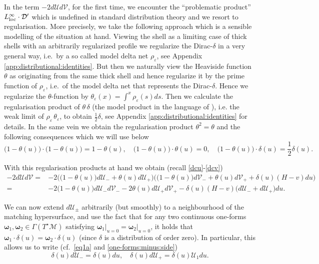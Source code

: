 \documentclass[11pt]{article}
\numberwithin{equation}{section}
\newcommand{\nn}{\nonumber}
\newcommand\M{\mathcal M}
\newcommand{\eps}{\varepsilon}
\newcommand{\bs}{\boldsymbol}
\newcommand{\cu}{\mathcal{U}}
\newcommand{\cv}{\mathcal{V}}
\begin{document}
In the term $-2d\cu d\cv$, for the first time, we encounter the ``problematic product'' $L^{\infty}_{\textup{loc}}\cdot \mathcal{D}'$ which is undefined in standard distribution theory and we resort to regularisation. More precisely, we take the following approach which is a sensible modelling of the situation at hand. Viewing the shell as a limiting case of thick shells with an arbitrarily regularized profile we regularize the Dirac-$\delta$ in a very general way, i.e.\ by a so called model delta net $\rho_\eps$, see Appendix \ref{app:distributional:identities}. But then we naturally view the Heaviside function $\theta$ as originating from the same thick shell and hence regularize it by the prime function of $\rho_\eps$, i.e.\ of the model delta net that represents the Dirac-$\delta$. Hence we regularize the $\theta$-function by $\theta_\eps(x)=\int^x\rho_\eps(s)ds$. Then we calculate the regularisation product of $\theta\,\delta$ (the model product in the language of  \cite[Ch.\ II § 7]{Obe:92}), i.e. the weak limit of $\rho_\eps\,\theta_\eps$, to obtain $\frac{1}{2}\delta$, see Appendix \ref{app:distributional:identities} for details. In the same vein we obtain the regularisation product $\theta^2=\theta$ and the following consequences which we will use below
\begin{equation}
\label{products:2}\big(1-\theta(u)\big)\cdot \big(1-\theta(u)\big)=1-\theta(u),\quad\big(1-\theta(u)\big)\cdot\theta(u)=0,\quad\big(1-\theta(u)\big)\cdot\delta(u)=\frac{1}{2}\delta(u).
\end{equation}

With this regularisation products at hand we obtain (recall \eqref{dcu}-\eqref{dcv})
\begin{align}
\nn -2d\cu d\cv=&-2 \Big(\big(1-\theta(u)\big)d\cu_-+\theta(u)d\cu_+\Big)  \Big(\big(1-\theta(u)\big) d\cv_-+\theta(u)d\cv_++\delta(u)(H-v)du\Big)\\
\label{mid:eq:1}=&-2\big(1-\theta(u)\big)d \cu_- d\cv_- -2\theta(u)d\cu_+ d\cv_+ -\delta(u) (H-v)\big(d\cu_-+d\cu_+\big) du.
\end{align}

We can now extend $d\cu_{\pm}$ arbitrarily (but smoothly) to a neighbourhood of the matching hypersurface, and use the fact that for any two continuous one-forms $\bs{\omega}_1,\bs{\omega}_2\in\Gamma(T^{\star}\M)$ satisfying $\bs{\omega}_1\vert_{u=0}=\bs{\omega}_2\vert_{u=0}$, it holds that $\bs{\omega}_1\cdot \delta(u) =\bs{\omega}_2\cdot \delta(u)$ (since $\delta$ is a distribution of order zero).  
In particular, this allows us to write 
(cf.\ \eqref{eq1a} and \eqref{one-forms:minus:side})
\begin{equation}
\label{mid:eq:2} \delta(u) d\cu_-=\delta(u) du,\quad\delta(u) d\cu_+=\delta(u) \cu_1 du.
\end{equation}
\end{document}
